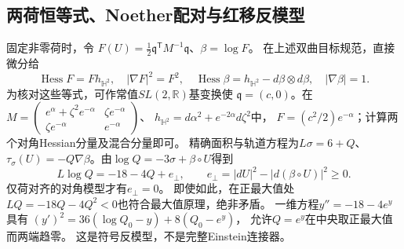 \documentclass[UTF8,a4paper,11pt,fontset=fandol]{ctexart}
\numberwithin{equation}{section}
\theoremstyle{definition}
\newcommand{\R}{\mathbb R}
\begin{document}
\subsection{两荷恒等式、Noether配对与红移反模型}
固定非零荷时，令
$F(U)=\frac12\mathfrak q^{\mathsf T}M^{-1}\mathfrak q$、$\beta=\log F$。
在上述双曲目标规范，直接微分给
\[
 \operatorname{Hess}F=Fh_{\mathbb H^2},\quad|\nabla F|^2=F^2,
 \quad\operatorname{Hess}\beta=h_{\mathbb H^2}-d\beta\otimes d\beta,
 \quad|\nabla\beta|=1.
\]
为核对这些等式，可作常值$SL(2,\R)$基变换使
$\mathfrak q=(c,0)$。在
$M=\left(\begin{smallmatrix}
e^\alpha+\zeta^2e^{-\alpha}&\zeta e^{-\alpha}\\
\zeta e^{-\alpha}&e^{-\alpha}
\end{smallmatrix}\right)$、
$h_{\mathbb H^2}=d\alpha^2+e^{-2\alpha}d\zeta^2$中，
$F=(c^2/2)e^{-\alpha}$；计算两个对角Hessian分量及混合分量即可。
精确面积与轨道方程为$L\sigma=6+Q$、
$\tau_\sigma(U)=-Q\nabla\beta$。由$\log Q=-3\sigma+\beta\circ U$得到
\begin{equation}\label{eq:charged-logQ}
 L\log Q=-18-4Q+e_\perp,
 \qquad e_\perp=|dU|^2-|d(\beta\circ U)|^2\ge0.
\end{equation}
仅荷对齐的对角模型才有$e_\perp=0$。
即使如此，在正最大值处$LQ=-18Q-4Q^2<0$也符合最大值原理，绝非矛盾。
一维方程$y''=-18-4e^y$具有
$(y')^2=36(\log Q_0-y)+8(Q_0-e^y)$，
允许$Q=e^y$在中央取正最大值而两端趋零。
这是符号反模型，不是完整Einstein连接器。
\end{document}

